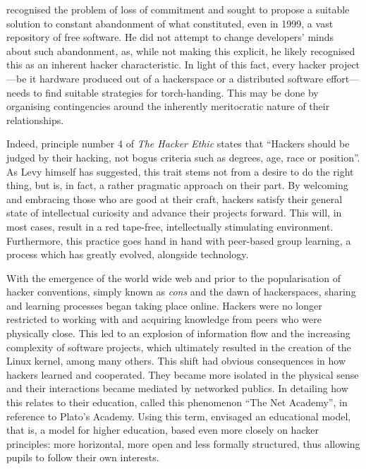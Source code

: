 \citeauthor{raymond99a} recognised the problem of loss of commitment and sought to propose a suitable solution to constant abandonment of what constituted, even in 1999, a vast repository of free software. He did not attempt to change developers' minds about such abandonment, as, while not making this explicit, he likely recognised this as an inherent hacker characteristic. In light of this fact, every hacker project ---be it hardware produced out of a hackerspace or a distributed software effort--- needs to find suitable strategies for torch-handing. This may be done by organising contingencies around the inherently meritocratic nature of their relationships.

Indeed, principle number 4 of \textit{The Hacker Ethic} states that ``Hackers should be judged by their hacking, not bogus criteria such
as degrees, age, race or position''. As Levy himself has suggested, this trait stems not from a desire to do the right thing, but is, in fact, a rather pragmatic approach on their part. By welcoming and embracing those who are good at their craft, hackers satisfy their general state of intellectual curiosity and advance their projects forward. This will, in most cases, result in a red tape-free, intellectually stimulating environment. Furthermore, this practice goes hand in hand with peer-based group learning, a process which has greatly evolved, alongside technology.

With the emergence of the world wide web and prior to the popularisation of hacker conventions, simply known as \textit{cons} and the dawn of hackerspaces, sharing and learning processes began taking place online. Hackers were no longer restricted to working with and acquiring knowledge from peers who were physically close. This led to an explosion of information flow and the increasing complexity of software projects, which ultimately resulted in the creation of the Linux kernel, among many others. This shift had obvious consequences in how hackers learned and cooperated. They became more isolated in the physical sense and their interactions became mediated by networked publics. In detailing how this relates to their education, \citet[p.75]{himanen01} called this phenomenon ``The Net Academy'', in reference to Plato's Academy. Using this term, \citeauthor{himanen01} envisaged an educational model, that is, a model for higher education, based even more closely on hacker principles: more horizontal, more open and less formally structured, thus allowing pupils to follow their own interests.

